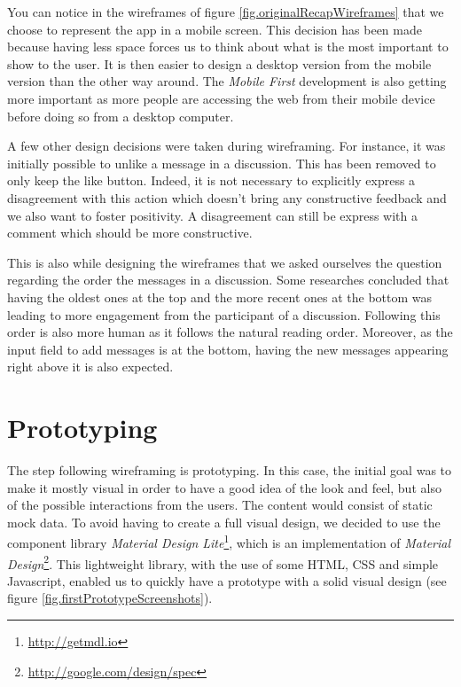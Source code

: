 \documentclass[a4paper,12pt, oneside]{article}
\begin{document}
You can notice in the wireframes of figure \ref{fig.originalRecapWireframes} that we choose to represent the app in a mobile screen.
This decision has been made because having less space forces us to think about what is the most important to show to the user.
It is then easier to design a desktop version from the mobile version than the other way around.
The \emph{Mobile First} development is also getting more important as more people are accessing the web from their mobile device before doing so from a desktop computer.

A few other design decisions were taken during wireframing.
For instance, it was initially possible to unlike a message in a discussion.
This has been removed to only keep the like button.
Indeed, it is not necessary to explicitly express a disagreement with this action which doesn't bring any constructive feedback and we also want to foster positivity.
A disagreement can still be express with a comment which should be more constructive.

This is also while designing the wireframes that we asked ourselves the question regarding the order the messages in a discussion.
Some researches \cite{mabande2010designing} concluded that having the oldest ones at the top and the more recent ones at the bottom was leading to more engagement from the participant of a discussion.
Following this order is also more human as it follows the natural reading order.
Moreover, as the input field to add messages is at the bottom, having the new messages appearing right above it is also expected.


\section{Prototyping}
The step following wireframing is prototyping.
In this case, the initial goal was to make it mostly visual in order to have a good idea of the look and feel, but also of the possible interactions from the users.
The content would consist of static mock data.
To avoid having to create a full visual design, we decided to use the component library \emph{Material Design Lite}\footnote{\url{http://getmdl.io}}, which is an implementation of \emph{Material Design}\footnote{\url{http://google.com/design/spec}}.
This lightweight library, with the use of some HTML, CSS and simple Javascript, enabled us to quickly have a prototype with a solid visual design (see figure \ref{fig.firstPrototypeScreenshots}).
\end{document}
